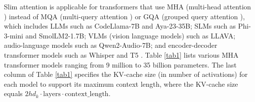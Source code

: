 \documentclass{article}
\numberwithin{equation}{section} %
\begin{document}
Slim attention is applicable for transformers that use MHA (multi-head attention \citep{vanilla}) instead of MQA (multi-query attention \citep{MQA}) or GQA (grouped query attention \citep{GQA}), which includes LLMs such as CodeLlama-7B and Aya-23-35B; SLMs such as Phi-3-mini and SmolLM2-1.7B; VLMs (vision language models) such as LLAVA; audio-language models such as Qwen2-Audio-7B; and encoder-decoder transformer models such as Whisper \citep{Whisper} and T5 \citep{T5}. Table \ref{tab1} lists various MHA transformer models ranging from 9 million to 35 billion parameters. The last column of Table \ref{tab1} specifies the KV-cache size (in number of activations) for each model to support its maximum context length, where the KV-cache size equals $2 h d_k \cdot \text{layers} \cdot \text{context\_length}$.

\begingroup \renewcommand{\arraystretch}{1.3} %
\end{document}
